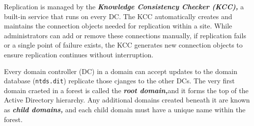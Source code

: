 Replication is managed by the \textbf{\textit{Knowledge Consistency Checker (KCC),}} a built-in service that runs on every DC. The KCC automatically creates and maintains the connection objects needed for replication within a site. While administrators can add or remove these connections manually, if replication fails or a single point of failure exists, the KCC generates new connection objects to ensure replication continues without interruption.

Every domain controller (DC) in a domain can accept updates to the domain database (\texttt{ntds.dit})  replicate those cjanges to the other DCs. The very first domain craeted in a forest is called the \textbf{\textit{root domain,}}and it forms the top of the Active Directory hierarchy. Any additional domains created beneath it are known as \textbf{\textit{child domains,}} and each child domain must have a unique name within the forest.

